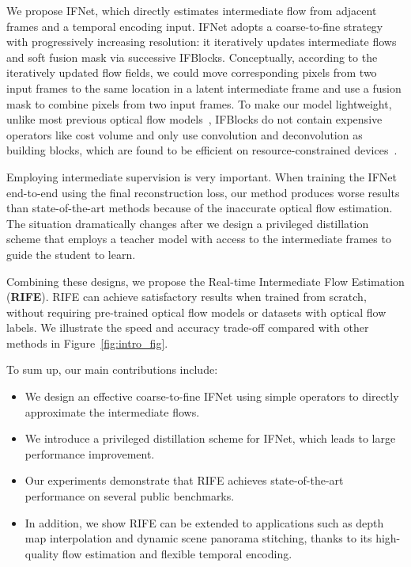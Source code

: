 \documentclass[final]{cvpr}
\begin{document}
We propose IFNet, which directly estimates intermediate flow from adjacent frames and a temporal encoding input. IFNet adopts a coarse-to-fine strategy~\cite{ilg2017flownet} with progressively increasing resolution: it iteratively updates intermediate flows and soft fusion mask via successive IFBlocks. Conceptually, according to the iteratively updated flow fields, we could move corresponding pixels from two input frames to the same location in a latent intermediate frame and use a fusion mask to combine pixels from two input frames. To make our model lightweight, unlike most previous optical flow models~\cite{dosovitskiy2015flownet, ilg2017flownet, sun2018pwc, hui2018liteflownet, teed2020raft}, IFBlocks do not contain expensive operators like cost volume and only use  convolution and deconvolution as building blocks, which are found to be efficient on resource-constrained devices~\cite{ding2021repvgg}.



Employing intermediate supervision is very important. When training the IFNet end-to-end using the final reconstruction loss, our method produces worse results than state-of-the-art methods because of the inaccurate optical flow estimation. The situation dramatically changes after we design a privileged distillation scheme that employs a teacher model with access to the intermediate frames to guide the student to learn.

Combining these designs, we propose the Real-time Intermediate Flow Estimation (\textbf{RIFE}). RIFE can achieve satisfactory results when trained from scratch, without requiring pre-trained optical flow models or datasets with optical flow labels. We illustrate the speed and accuracy trade-off compared with other methods in Figure~\ref{fig:intro_fig}. 

To sum up, our main contributions include:
\begin{itemize}
	\item We design an effective coarse-to-fine IFNet using simple operators to directly approximate the intermediate flows. 
	\item We introduce a privileged distillation scheme for IFNet, which leads to large performance improvement.
	\item Our experiments demonstrate that RIFE achieves state-of-the-art performance on several public benchmarks. 
	\item In addition, we show RIFE can be extended to applications such as depth map interpolation and dynamic scene panorama stitching, thanks to its high-quality flow estimation and flexible temporal encoding.
\end{itemize}
\end{document}
